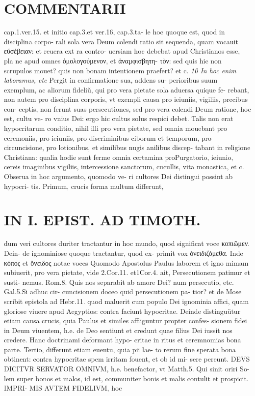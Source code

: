 \documentclass{article}
\begin{document}
\begin{pages}
\section*{COMMENTARII }
\marginpar{[ p.102 ]}\pstart cap.1.ver.15. et initio cap.3.et ver.16, cap.3.ta- le hoc quoque est, quod in disciplina corpo- rali sola vera Deum colendi ratio sit sequenda, quam vocauit εὔσέβειαν: et reuera ext ra contro- uersiam hoc debebat apud Christianos esse, pla ne apud omnes ὁμολογούμενον, et ἀναμφισβητη- τὸν: sed quis hic non scrupulos mouet? quis non bonam intentionem praefert? et c.  \pend
\textit{10 In hoc enim laboramus, etc }\pstart Pergit in confirmatione sua, addens su- perioribus suum exemplum, ac aliorum fideliũ, qui pro vera pietate sola aduersa quique fe- rebant, non autem pro disciplina corporis, vt exempli causa pro ieiuniis, vigiliis, precibus con- ceptis, non ferunt suas persecutiones, sed pro vera colendi Deum ratione, hoc est, cultu ve- ro vnius Dei: ergo hic cultus solus respici debet. Talis non erat hypocritarum conditio, nihil illi pro vera pietate, sed omnia mouebant pro ceremoniis, pro ieiuniis, pro discriminibus  ciborum et temporum, pro circuncisione, pro lotionibus, et similibus nugis anilibus discep- tabant in religione Christiana: qualia hodie sunt ferme omnia certamina proPurgatorio, ieiunio, cereis imaginibus  vigiliis, intercessione sanctorum, cucullis, vita monastica, et c. Obserua in hoc argumento, quomodo ve- ri cultores Dei distingui possint ab hypocri- tis. Primum, crucis forma multum differunt,  \pend
\section*{IN I. EPIST. AD TIMOTH. }
\marginpar{[ p.103 ]}\pstart dum veri cultores duriter tractantur in hoc mundo, quod significat voce κοπιῶμεν. Dein- de ignominiose quoque tractantur, quod ex- primit vox ὀνειδιζόμεθα. Inde κόπος et ὄνειδος notae voces  \pend\pstart Quomodo Apostolus Paulus laborem et igno mimam subiuerit, pro vera pietate, vide 2.Cor.11. et1Cor.4. ait, Persecutionem patimur et susti- nemus. Rom.8. Quis nos separabit ab amore Dei? num persecutio, etc. Gal.5.Si adhuc cir- cuncisionem doceo quid persecutionem pa- tior? et de Mose scribit epistola ad Hebr.11. quod maluerit cum populo Dei ignominia affici, quam gloriose viuere apud Aegyptios: contra faciunt hypocritae.  \pend\pstart Deinde distinguütur etiam causa crucis, quia Paulus et similes affliguntur propter confes- sionem fidei in Deum viuentem, h.e. de Deo sentiunt et credunt quae filius Dei iussit nos credere. Hanc doctrinami deformant hypo- critae in ritus et ceremnomias bona parte.  \pend\pstart Tertio, differunt etiam euentu, quia pii lae- to rerum fine sperata bona obtinent: contra hypocritae spem irritam fouent, et ob id mi- sere pereunt.  \pend\pstart DEVS DICITVR SERVATOR OMNIVM, h.e. benefactor, vt Matth.5. Qui sinit oriri So- lem super bonos et malos, id est, communiter bonis et malis contulit et prospicit. IMPRI- MIS AVTEM FIDELIVM, hoc  \pend

\end{pages}
\end{document}

